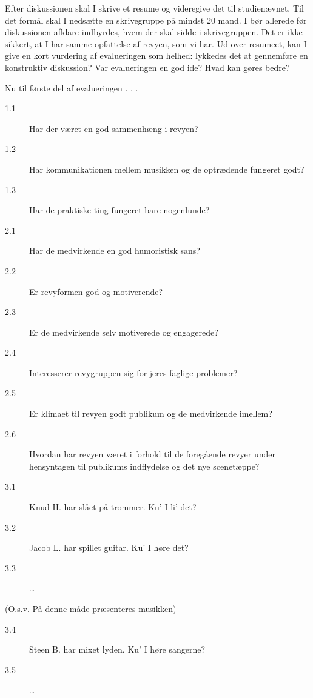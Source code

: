 \documentclass{article}
\begin{document}
\begin{sketch}
         Efter diskussionen skal I skrive et resume og
         videregive det til studienævnet. Til det formål skal
         I nedsætte en skrivegruppe på mindst 20 mand. I bør
         allerede før diskussionen afklare indbyrdes, hvem
         der skal sidde i skrivegruppen. Det er ikke sikkert,
         at I har samme opfattelse af revyen, som vi har.
         Ud over resumeet, kan I give en kort vurdering af
         evalueringen som helhed: lykkedes det at gennemføre
         en konstruktiv diskussion? Var evalueringen en
         god ide? Hvad kan gøres bedre?

         Nu til første del af evalueringen . . .

         \begin{description}

   \item[1.1]Har der været en god sammenhæng i revyen?
   \item[1.2]Har kommunikationen mellem musikken og de 
             optrædende fungeret godt?
  \item[1.3] Har de praktiske ting fungeret bare nogenlunde?

  \item[2.1] Har de medvirkende en god humoristisk sans?
  \item[2.2] Er revyformen god og motiverende?
  \item[2.3] Er de medvirkende selv motiverede og engagerede?
  \item[2.4] Interesserer revygruppen sig for jeres 
             faglige problemer?
  \item[2.5] Er klimaet til revyen godt publikum og de
             medvirkende imellem?
  \item[2.6] Hvordan har revyen været i forhold til de
             foregående revyer under hensyntagen til 
             publikums indflydelse og det nye scenetæppe?
         \end{description}
         \begin{description}
  \item[3.1] Knud H. har slået på trommer. Ku' I li' det?
  \item[3.2] Jacob L. har spillet guitar. Ku' I høre det?
  \item[3.3] \ldots
  \end{description}
  
(O.s.v. På denne måde præsenteres musikken)
\begin{description}
  \item[3.4] Steen B. har mixet lyden. Ku' I høre sangerne?
  \item[3.5] \ldots
  \end{description}
  

\end{sketch}
\end{document}
